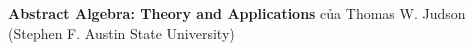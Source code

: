 \documentclass{article}
\begin{document}
\textbf{Abstract Algebra: Theory and Applications} của Thomas W. Judson (Stephen F. Austin State University)






\end{document}
